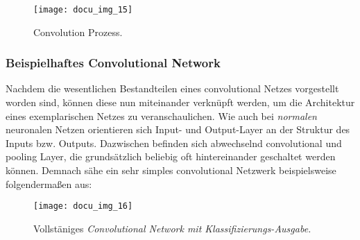 \begin{figure}[h]
    \centering
    \texttt{[image: docu\_img\_15]}
    \caption{Convolution Prozess.}
    \label{fig:convolution-process}
\end{figure}

\subsubsection{Beispielhaftes Convolutional Network}

Nachdem die wesentlichen Bestandteilen eines convolutional Netzes vorgestellt worden sind, können diese nun miteinander
verknüpft werden, um die Architektur eines exemplarischen Netzes zu veranschaulichen. Wie auch bei \textit{normalen} neuronalen
Netzen orientieren sich Input- und Output-Layer an der Struktur des Inputs bzw. Outputs. Dazwischen befinden sich
abwechselnd convolutional und pooling Layer, die grundsätzlich beliebig oft hintereinander geschaltet werden können.
Demnach sähe ein sehr simples convolutional Netzwerk beispielsweise folgendermaßen aus:

\begin{figure}[h]
    \centering
    \texttt{[image: docu\_img\_16]}
    \caption{Vollstäniges \textit{Convolutional Network mit Klassifizierungs-Ausgabe.}}
    \label{fig:convoultional-newtork}
\end{figure}
